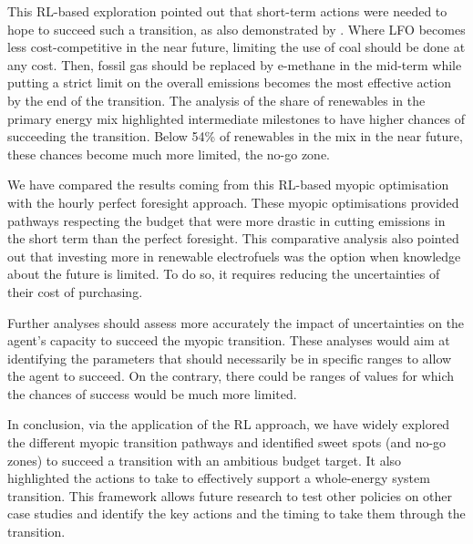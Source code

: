 
This \gls{RL}-based exploration pointed out that short-term actions were needed to hope to succeed such a transition, as also demonstrated by \citet{luderer2018residual}. Where \gls{LFO} becomes less cost-competitive in the near future, limiting the use of coal should be done at any cost. Then, fossil gas should be replaced by e-methane in the mid-term while putting a strict limit on the overall emissions becomes the most effective action by the end of the transition. The analysis of the share of renewables in the primary energy mix highlighted intermediate milestones to have higher chances of succeeding the transition. Below 54\% of renewables in the mix in the near future, these chances become much more limited, \ie the no-go zone. 

We have compared the results coming from this \gls{RL}-based myopic optimisation with the hourly perfect foresight approach. These myopic optimisations provided pathways respecting the  budget that were more drastic in cutting emissions in the short term than the perfect foresight. This comparative analysis also pointed out that investing more in renewable electrofuels was the option when knowledge about the future is limited. To do so, it requires reducing the uncertainties of their cost of purchasing. 

Further analyses should assess more accurately the impact of uncertainties on the agent's capacity to succeed the myopic transition. These analyses would aim at identifying the parameters that should necessarily be in specific ranges to allow the agent to succeed. On the contrary, there could be ranges of values for which the chances of success would be much more limited.

In conclusion, via the application of the \gls{RL} approach, we have widely explored the different myopic transition pathways and identified sweet spots (and no-go zones) to succeed a transition with an ambitious  budget target. It also highlighted the actions to take to effectively support a whole-energy system transition. This framework allows future research to test other policies on other case studies and identify the key actions and the timing to take them through the transition.